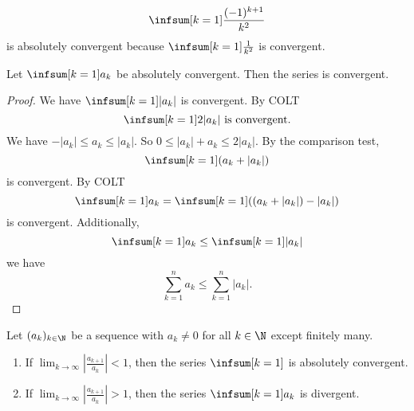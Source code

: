 \documentclass[10pt, a4paper]{article}
\newcommand{\dseq}[2][n]{(#2_#1)_{#1 \in \N}}
\begin{document}
\begin{example}
    \[
    \infsum[k = 1]\frac{(-1) ^ {k + 1}}{k ^ 2}
    \]
    is absolutely convergent because $\infsum[k = 1]\frac{1}{k ^ 2}$ is convergent.
\end{example}

\begin{theorem}
    Let $\infsum[k = 1]a_k$ be absolutely convergent.
    Then the series is convergent.
    \begin{proof}
        We have $\infsum[k = 1]|a_k|$ is convergent.
        By COLT
        \[
        \infsum[k = 1]2|a_k|\text{ is convergent}.
        \]
        We have $-|a_k| \leq a_k \leq |a_k|$.
        So $0 \leq |a_k| + a_k \leq 2|a_k|$.
        By the comparison test,
        \[
        \infsum[k = 1](a_k + |a_k|)
        \]
        is convergent.
        By COLT
        \[
        \infsum[k = 1]a_k = \infsum[k = 1]((a_k + |a_k|) - |a_k|)
        \]
        is convergent.
        Additionally,
        \[
        \infsum[k = 1]a_k \leq \infsum[k = 1]|a_k|
        \]
        we have
        \[
        \sum_{k = 1}^{n}a_k \leq \sum_{k = 1}^{n}|a_k|.
        \]
    \end{proof}
\end{theorem}

\begin{theorem}
    Let $\dseq[k]{a}$ be a sequence with $a_k \neq 0$ for all $k \in \N$ except finitely many.
    \begin{enumerate}[label = (\alph*)]
        \item If $\displaystyle\lim_{k \to \infty}\left|\frac{a_{k + 1}}{a_k}\right| < 1$,
        then the series $\displaystyle\infsum[k = 1]$ is absolutely convergent.
        \item If $\displaystyle\lim_{k \to \infty}\left|\frac{a_{k + 1}}{a_k}\right| > 1$,
        then the series $\displaystyle\infsum[k = 1]a_k$ is divergent.
    \end{enumerate}
\end{theorem}
\end{document}

